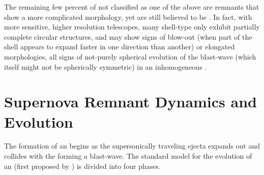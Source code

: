 The remaining few percent of \snrs{} not classified as one of the above are remnants that show a more complicated morphology, yet are still believed to be \snrs{}. In fact, with more sensitive, higher resolution telescopes, many shell-type \snrs{} only exhibit partially complete circular structures, and may show signs of blow-out (when part of the shell appears to expand faster in one direction than another) or elongated morphologies, all signs of not-purely spherical evolution of the blast-wave (which itself might not be spherically symmetric) in an inhomogeneous \ism{}.

\section{\label{Rems:evo}Supernova Remnant Dynamics and  Evolution}
The formation of an \snr{} begins as the supersonically traveling ejecta expands out and collides with the \ism{}  forming a blast-wave. The standard model for the evolution of an \snr{} (first proposed by \cite{Woltjer72}) is divided into four phases. 

